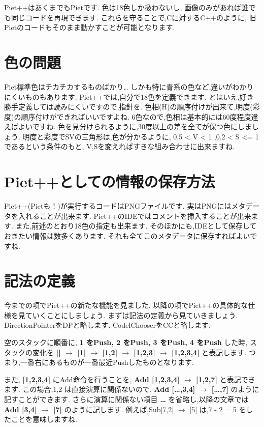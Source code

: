 Piet++はあくまでもPietです. 色は18色しか扱わないし,
画像のみがあれば誰でも同じコードを再現できます.
これらを守ることで,Cに対するC++のように,
旧Pietのコードもそのまま動かすことが可能となります.

\section{色の問題}

Piet標準色はチカチカするものばかり\ldots{}
しかも特に青系の色など,違いがわかりにくいものもあります.
Piet++では,自分で18色を定義できます.
とはいえ,好き勝手定義しては読みにくいですので,指針を.
色相(H)の順序付けが出来て,明度(彩度)の順序付けができればいいですよね.
6色なので,色相は基本的には60度程度違えばよいですね.
色を見分けられるように,30度以上の差を全てが保つ色にしましょう.
明度と彩度でSVの三角形は,色が分かるように, 0.5 \textless{} V \textless{}
1 ,0.2 \textless{} S \textless{}= 1であるという条件のもと,
V,Sを変えればすきな組み合わせに出来ますね.

\section{Piet++としての情報の保存方法}

Piet++(Pietも！)が実行するコードはPNGファイルです.
実はPNGにはメタデータを入れることが出来ます.
Piet++のIDEではコメントを挿入することが出来ます.
また,前述のとおり18色の指定も出来ます.
そのほかにも,IDEとして保存しておきたい情報は数多くあります.
それも全てこのメタデータに保存すればよいですね.

\section{記法の定義}

今までの項でPiet++の新たな機能を見ました.
以降の項でPiet++の具体的な仕様を見ていくことにしましょう.
まずは記法の定義から見ていきましょう. DirectionPointerをDPと略します.
CodelChooserをCCと略します.

空のスタックに順番に, \textbf{1 をPush, 2 をPush, 3 をPush, 4 をPush}
した時, スタックの変化を \textbf{{[}{]} $\to$ {[}1{]}
$\to$ {[}1,2{]} $\to$ {[}1,2,3{]} $\to$
{[}1,2,3,4{]}} と表記します.
つまり,一番右にあるものが一番最近Pushしたものとなります.

また, \textbf{{[}1,2,3,4{]}} にAdd命令を行うことを, \textbf{Add
{[}1,2,3,4{]} $\to$ {[}1,2,7{]}} と表記できます. この場合,1,2
は直接演算に関係ないので, \textbf{Add {[}\ldots{},3,4{]} $\to$
{[}\ldots{},7{]}} のように記すことができます. さらに演算に関係ない項目
\textbf{\ldots{}} を省略し,以降の文章では \textbf{Add {[}3,4{]}
$\to$ {[}7{]}} のように記します. 例えば,Sub{[}7,2{]}
$\to$ {[}5{]} は,7 - 2 = 5 をしたことを意味しますね.

